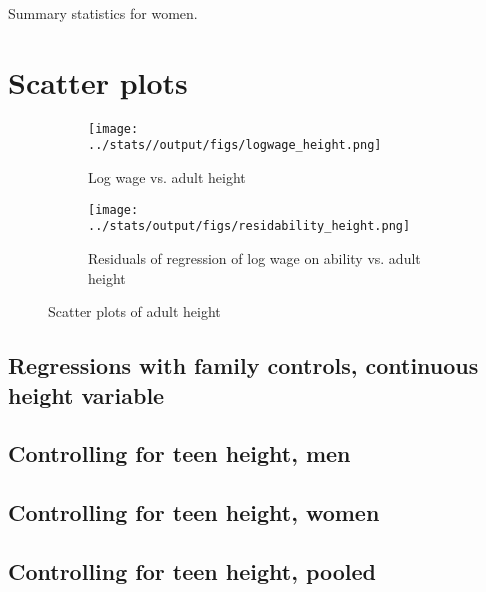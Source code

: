 \documentclass{article}
\begin{document}
\begin{table}[h]
\label{tab:summary_women}
\caption{Summary statistics for women.}

\end{table}

\clearpage

\section{Scatter plots}
\begin{figure}[htbp]
	\centering
	\begin{subfigure}[b]{\textwidth}
		\centering
		\texttt{[image: ../stats//output/figs/logwage\_height.png]}	
		\label{fig:logwageheight}
		\caption{Log wage vs. adult height}
	\end{subfigure}

	\begin{subfigure}[b]{\textwidth}
		\centering
		\texttt{[image: ../stats/output/figs/residability\_height.png]}	
		\label{fig:residabilityheight}
		\caption{Residuals of regression of log wage on ability vs. adult height}
	\end{subfigure}
	\caption{Scatter plots of adult height}
\end{figure}

\clearpage

\begin{landscape}
\section{Regressions with family controls, continuous height variable}
\subsection{Controlling for teen height, men}

\end{landscape}

\begin{landscape}
\subsection{Controlling for teen height, women}

\end{landscape}

\begin{landscape}
\subsection{Controlling for teen height, pooled}

\end{landscape}
\end{document}
